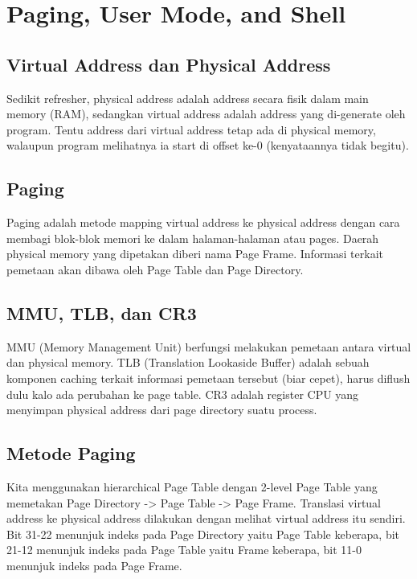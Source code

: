 \chapter{Paging, User Mode, and Shell}

\section{Virtual Address dan Physical Address}

Sedikit refresher, physical address adalah address secara fisik dalam main memory (RAM), sedangkan virtual address adalah address yang di-generate oleh program. Tentu address dari virtual address tetap ada di physical memory, walaupun program melihatnya ia start di offset ke-0 (kenyataannya tidak begitu).

\section{Paging}

Paging adalah metode mapping virtual address ke physical address dengan cara membagi blok-blok memori ke dalam halaman-halaman atau pages. Daerah physical memory yang dipetakan diberi nama Page Frame. Informasi terkait pemetaan akan dibawa oleh Page Table dan Page Directory.

\section{MMU, TLB, dan CR3}

MMU (Memory Management Unit) berfungsi melakukan pemetaan antara virtual dan physical memory. TLB (Translation Lookaside Buffer) adalah sebuah komponen caching terkait informasi pemetaan tersebut (biar cepet), harus diflush dulu kalo ada perubahan ke page table. CR3 adalah register CPU yang menyimpan physical address dari page directory suatu process.

\section{Metode Paging}

Kita menggunakan hierarchical Page Table dengan 2-level Page Table yang memetakan Page Directory -> Page Table -> Page Frame. Translasi virtual address ke physical address dilakukan dengan melihat virtual address itu sendiri. Bit 31-22 menunjuk indeks pada Page Directory yaitu Page Table keberapa, bit 21-12 menunjuk indeks pada Page Table yaitu Frame keberapa, bit 11-0 menunjuk indeks pada Page Frame.

